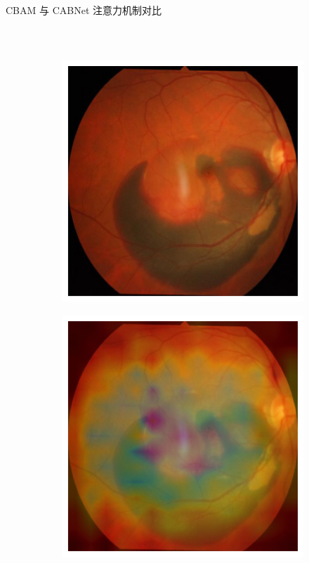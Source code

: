 \documentclass[9pt, aspectratio=1610]{beamer}
\begin{document}
\begin{frame}{CBAM 与 CABNet 注意力机制对比}
\begin{columns}
\begin{column}{0.6\textwidth}
\begin{figure}[H]
\begin{subfigure}[b]{0.2\textwidth}
                \end{subfigure} \\
                \vspace{2mm}
                \begin{subfigure}[b]{0.2\textwidth}
                    \raggedleft
                    \includegraphics[width=\textwidth]{image-2.png}
                \end{subfigure}
                \hspace{2mm}
                \begin{subfigure}[b]{0.2\textwidth}
                    \centering
                    \includegraphics[width=\textwidth]{cbam-heatmap-2.png}

\end{subfigure}
\end{figure}
\end{column}
\end{columns}
\end{frame}
\end{document}
